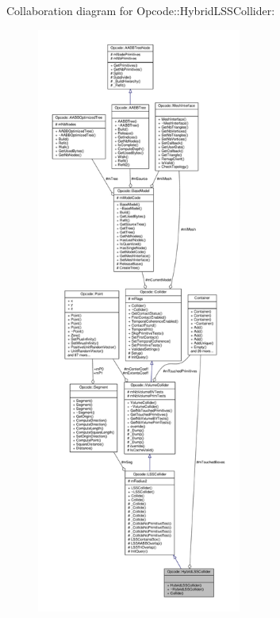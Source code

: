 Collaboration diagram for Opcode\+:\+:Hybrid\+L\+S\+S\+Collider\+:
\nopagebreak
\begin{figure}[H]
\begin{center}
\leavevmode
\includegraphics[height=550pt]{dc/dc7/classOpcode_1_1HybridLSSCollider__coll__graph}
\end{center}
\end{figure}
